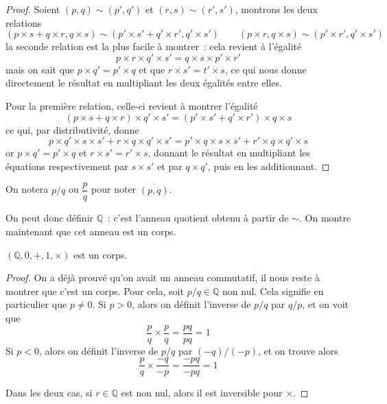 \begin{proof}
  Soient $(p,q)\sim(p',q')$ et $(r,s)\sim(r',s')$, montrons les deux relations
  \[(p\times s + q\times r, q \times s) \sim
  (p'\times s' + q'\times r',q'\times s')\qquad
  (p\times r, q\times s)\sim(p'\times r', q'\times s')\]
  la seconde relation est la plus facile à montrer~: cela revient à l'égalité
  \[p\times r \times q' \times s' = q\times s \times p' \times r'\]
  mais on sait que $p\times q' = p' \times q$ et que
  $r \times s' = t' \times s$, ce qui nous donne directement le résultat en
  multipliant les deux égalités entre elles.

  Pour la première relation, celle-ci revient à montrer l'égalité
  \[(p\times s + q \times r)\times q' \times s' =
  (p'\times s' + q' \times r')\times q \times s\]
  ce qui, par distributivité, donne
  \[p\times q' \times s \times s' + r \times q \times q' \times s' =
  p'\times q \times s \times s' + r' \times q \times q' \times s\]
  or $p\times q' = p' \times q$ et $r\times s' = r' \times s$, donnant le
  résultat en multipliant les équations respectivement par $s\times s'$ et par
  $q\times q'$, puis en les additionnant.
\end{proof}

\begin{notation}
  On notera $p/q$ ou $\dfrac{p}{q}$ pour noter $\overline{(p,q)}$.
\end{notation}

On peut donc définir $\mathbb Q$~: c'est l'anneau quotient obtenu à partir de
$\sim$. On montre maintenant que cet anneau est un corps.

\begin{proposition}
  $(\mathbb Q,0,+,1,\times)$ est un corps.
\end{proposition}

\begin{proof}
  On a déjà prouvé qu'on avait un anneau commutatif, il nous reste à montrer que
  c'est un corps. Pour cela, soit $p/q\in\mathbb Q$ non nul. Cela signifie en
  particulier que $p \neq 0$. Si $p > 0$, alors on définit l'inverse
  de $p/q$ par $q/p$, et on voit que
  \[\frac{p}{q}\times\frac{p}{q} = \frac{pq}{pq} = 1\]
  Si $p < 0$, alors on définit l'inverse de $p/q$ par $(-q)/(-p)$, et on
  trouve alors
  \[\frac{p}{q}\times\frac{-q}{-p} = \frac{-pq}{-pq} = 1\]

  Dans les deux cas, si $r\in \mathbb Q$ est non nul, alors il est inversible
  pour $\times$.
\end{proof}

